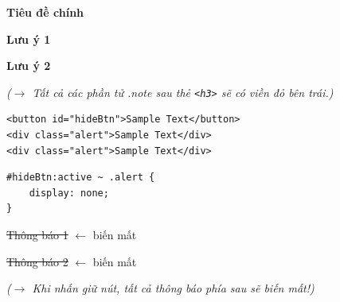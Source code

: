\documentclass[11pt,oneside]{book}
\newcommand{\codeinline}[1]{\textcolor{accentOrange}{\texttt{#1}}}
\begin{document}
\begin{browserWindow}
\sffamily\small
{\bfseries\large\textcolor{darkText}{Tiêu đề chính}} \par\vspace{4pt}
\begin{tcolorbox}[arc=0pt, colback=white, colframe=white, boxrule=0pt, boxsep=2pt, left=10pt, right=4pt, borderline west={3pt}{0pt}{red}]
\textcolor{darkText}{\textbf{Lưu ý 1}}
\end{tcolorbox}\vspace{2pt}
\begin{tcolorbox}[arc=0pt, colback=white, colframe=white, boxrule=0pt, boxsep=2pt, left=10pt, right=4pt, borderline west={3pt}{0pt}{red}]
\textcolor{darkText}{\textbf{Lưu ý 2}}
\end{tcolorbox}\vspace{4pt}
\textcolor{gray!70}{\small\textit{($\rightarrow$ Tất cả các phần tử .note sau thẻ \codeinline{<h3>} sẽ có viền đỏ bên trái.)}}
\end{browserWindow}

\begin{codeWindow}
\begin{lstlisting}[language=HTML5]
<button id="hideBtn">Sample Text</button>
<div class="alert">Sample Text</div>
<div class="alert">Sample Text</div>
\end{lstlisting}

\begin{lstlisting}[language=CSS3]
#hideBtn:active ~ .alert {
    display: none;
}
\end{lstlisting}
\end{codeWindow}

\begin{browserWindow}
\sffamily\small
{} \par\vspace{4pt}
\textcolor{gray!50}{\sout{Thông báo 1}} {\small\textcolor{gray!60}{$\leftarrow$ biến mất}} \par\vspace{2pt}
\textcolor{gray!50}{\sout{Thông báo 2}} {\small\textcolor{gray!60}{$\leftarrow$ biến mất}} \par\vspace{4pt}
\textcolor{gray!70}{\small\textit{($\rightarrow$ Khi nhấn giữ nút, tất cả thông báo phía sau sẽ biến mất!)}}
\end{browserWindow}
\end{document}
